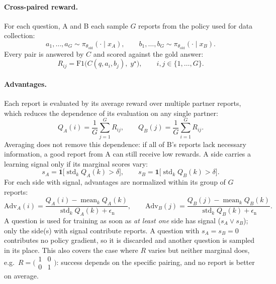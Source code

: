 \documentclass[11pt]{article}
\DeclareMathOperator{\mean}{mean}
\DeclareMathOperator{\stdev}{std}
\begin{document}
\paragraph{Cross-paired reward.}
For each question, A and B each sample $G$ reports from the policy used
for data collection:
\[
  a_1, \dots, a_G \sim \pi_{\theta_{\mathrm{old}}}(\cdot \mid x_A),
  \qquad
  b_1, \dots, b_G \sim \pi_{\theta_{\mathrm{old}}}(\cdot \mid x_B).
\]
Every pair is answered by $C$ and scored against the gold answer:
\begin{equation}
  R_{ij} = \mathrm{F1}\big(C(q, a_i, b_j),\; y^\star\big),
  \qquad i, j \in \{1, \dots, G\}.
  \label{eq:reward}
\end{equation}

\paragraph{Advantages.}
Each report is evaluated by its average reward over multiple partner
reports, which reduces the dependence of its evaluation on any single
partner:
\begin{equation}
  Q_A(i) = \frac{1}{G}\sum_{j=1}^{G} R_{ij},
  \qquad
  Q_B(j) = \frac{1}{G}\sum_{i=1}^{G} R_{ij}.
  \label{eq:marginal}
\end{equation}
Averaging does not remove this dependence: if all of B's reports lack
necessary information, a good report from A can still receive low rewards.
A side carries a learning signal only if its marginal scores vary:
\begin{equation}
  s_A = \mathbf{1}\big[\stdev_k Q_A(k) > \delta\big],
  \qquad
  s_B = \mathbf{1}\big[\stdev_k Q_B(k) > \delta\big].
  \label{eq:signal}
\end{equation}
For each side with signal, advantages are normalized within its group of
$G$ reports:
\begin{equation}
  \mathrm{Adv}_A(i) = \frac{Q_A(i) - \mean_k Q_A(k)}{\stdev_k Q_A(k) + \epsilon_{\mathrm{n}}},
  \qquad
  \mathrm{Adv}_B(j) = \frac{Q_B(j) - \mean_k Q_B(k)}{\stdev_k Q_B(k) + \epsilon_{\mathrm{n}}}.
  \label{eq:adv}
\end{equation}
A question is used for training as soon as \emph{at least one} side has
signal ($s_A \vee s_B$); only the side(s) with signal contribute reports.
A question with $s_A = s_B = 0$ contributes no policy gradient, so it is
discarded and another question is sampled in its place. This also covers the
case where $R$ varies but neither marginal does, e.g.\
$R = \bigl(\begin{smallmatrix} 1 & 0 \\ 0 & 1 \end{smallmatrix}\bigr)$:
success depends on the specific pairing, and no report is better on average.
\end{document}
